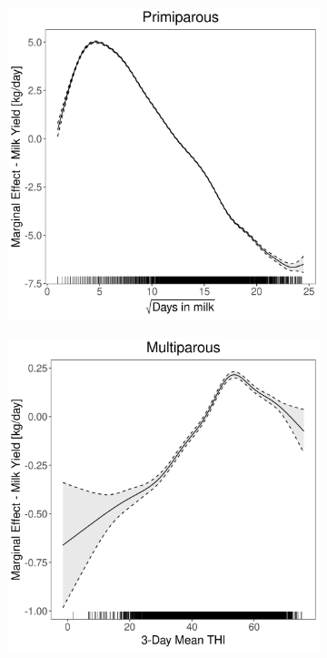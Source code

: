 \begin{figure}[H]
\begin{subfigure}[b]{0.45\textwidth}
    \end{subfigure}
    \hspace{0.05\textwidth} %
    \begin{subfigure}[b]{0.45\textwidth}
        \centering
        \includegraphics[width=\textwidth]{thesis/figures/models/milk/full/bs_milk_full/bs_milk_full_marginal_dim_milk_primi.png}
    \end{subfigure}
    \begin{subfigure}[b]{0.45\textwidth}
        \centering
        \includegraphics[width=\textwidth]{thesis/figures/models/milk/full/bs_milk_full/bs_milk_full_marginal_thi_milk_multi.png}

\end{subfigure}
\end{figure}
